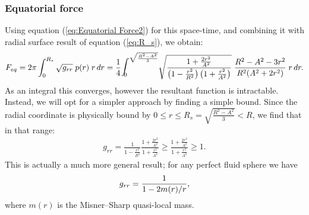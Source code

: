 \documentclass[12pt]{article}
\begin{document}
\subsubsection{Equatorial force}

Using equation (\ref{eq:Equatorial Force2}) for this space-time, and combining it with radial surface result of equation (\ref{eq:R_s}), we obtain:
%
\begin{equation}
    F_{eq} = 2\pi\int^{R_s}_0\sqrt{g_{rr}} \;p(r)\; r\, dr 
    = \frac{1}{4}\hbox{\Large $\displaystyle\int$}^{\sqrt{\frac{R^2 - A^2}{3}}}_{\!\!\!\!\!0}
    \sqrt{\frac{1  + \frac{2r^2}{A^2}}{\left(1- \frac{r^2}{R^2}\right)\left(1+ \frac{r^2}{A^2}\right)}} 
    \;  \frac{R^2 - A^2 - 3r^2}{R^2(A^2 + 2r^2)} \; r \,dr.
\end{equation}
%
As an integral this converges, however the resultant function is intractable. Instead, we will opt for a simpler approach by finding a simple bound. Since the radial coordinate is physically bound by $0\leq r \leq R_s = \sqrt{\frac{R^2 - A^2}{3}}<R$, we find that in that range:
%
\begin{eqnarray}
    g_{rr} = \frac{1}{1- \frac{r^2}{R^2}} \frac{1  + \frac{2r^2}{A^2}}{1+ \frac{r^2}{A^2}} \geq  \frac{1  + \frac{2r^2}{A^2}}{1+ \frac{r^2}{A^2}} \geq 1.
\end{eqnarray}
This is actually a much more general result; for any perfect fluid sphere we have
\begin{equation}
g_{rr}={1\over1-2m(r)/r},
\end{equation}
where $m(r)$ is the Misner--Sharp quasi-local mass. 
\end{document}
